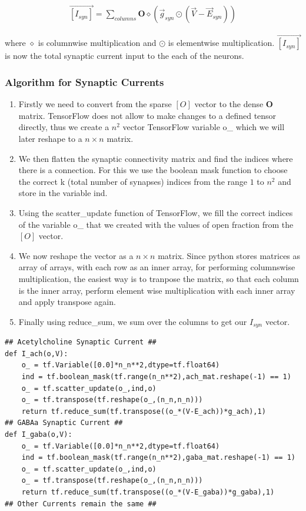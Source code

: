 \documentclass[10pt,letterpaper]{article}
\begin{document}
\begin{eqnarray}\vec{[I_{syn}]}=\sum_{columns}\mathbf{O}\diamond(\vec{g}_{syn}\odot(\vec{V}-\vec{E}_{syn}))\end{eqnarray}

where $\diamond$ is columnwise multiplication and $\odot$ is elementwise multiplication. $\vec{[I_{syn}]}$ is now the total synaptic current input to the each of the neurons.

\subsubsection*{Algorithm for Synaptic Currents}

\begin{enumerate}
\item Firstly we need to convert from the sparse $[O]$ vector to the dense $\mathbf{O}$ matrix. TensorFlow does not allow to make changes to a defined tensor directly, thus we create a $n^{2}$ vector TensorFlow variable o\_ which we will later reshape to a $n\times n$ matrix.
\item We then flatten the synaptic connectivity matrix and find the indices where there is a connection. For this we use the boolean mask function to choose the correct k (total number of synapses) indices from the range $1$ to $n^2$ and store in the variable ind.
\item Using the scatter\_update function of TensorFlow, we fill the correct indices of the variable o\_ that we created with the values of open fraction from the $[O]$ vector.
\item We now reshape the vector as a $n\times n$ matrix. Since python stores matrices as array of arrays, with each row as an inner array, for performing columnswise multiplication, the easiest way is to tranpose the matrix, so that each column is the inner array, perform element wise multiplication with each inner array and apply transpose again.
\item Finally using reduce\_sum, we sum over the columns to get our $I_{syn}$ vector.
\end{enumerate}

\begin{verbatim}
## Acetylcholine Synaptic Current ##
def I_ach(o,V):
    o_ = tf.Variable([0.0]*n_n**2,dtype=tf.float64)
    ind = tf.boolean_mask(tf.range(n_n**2),ach_mat.reshape(-1) == 1)
    o_ = tf.scatter_update(o_,ind,o)
    o_ = tf.transpose(tf.reshape(o_,(n_n,n_n)))
    return tf.reduce_sum(tf.transpose((o_*(V-E_ach))*g_ach),1)
## GABAa Synaptic Current ##
def I_gaba(o,V):
    o_ = tf.Variable([0.0]*n_n**2,dtype=tf.float64)
    ind = tf.boolean_mask(tf.range(n_n**2),gaba_mat.reshape(-1) == 1)
    o_ = tf.scatter_update(o_,ind,o)
    o_ = tf.transpose(tf.reshape(o_,(n_n,n_n)))
    return tf.reduce_sum(tf.transpose((o_*(V-E_gaba))*g_gaba),1)
## Other Currents remain the same ##
\end{verbatim}
\end{document}
